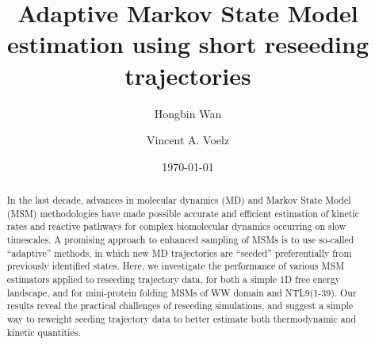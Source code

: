 \documentclass[%
 aip,
rsi,%
 amsmath,amssymb,
 reprint,%
]{revtex4-1}
\begin{document}

\title[MSM estimation with short reseeding trajectories]{Adaptive Markov State Model estimation using short reseeding trajectories}%




\author{Hongbin Wan}
\author{Vincent A. Voelz}


\date{\today}%

\begin{abstract}
In the last decade, advances in molecular dynamics (MD) and Markov State Model (MSM) methodologies have made possible accurate and efficient estimation of kinetic rates and reactive pathways for complex biomolecular dynamics occurring on slow timescales.  A promising approach to enhanced sampling of MSMs is to use so-called “adaptive” methods, in which new MD trajectories are “seeded” preferentially from previously identified states.  Here, we investigate the performance of various MSM estimators applied to reseeding trajectory data, for both a simple 1D free energy landscape, and for mini-protein folding MSMs of WW domain and NTL9(1-39).  Our results reveal the practical challenges of reseeding simulations, and suggest a simple way to reweight seeding trajectory data to better estimate both thermodynamic and kinetic quantities.
\end{abstract}

\maketitle
\end{document}
